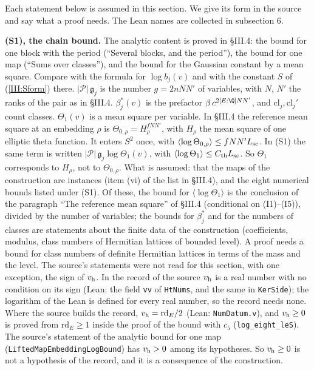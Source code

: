 \documentclass[11pt,letterpaper]{article}
\begin{document}
Each statement below is assumed in this section. We give its form in the source and say what a proof
needs. The Lean names are collected in subsection 6.

\textbf{(S1), the chain bound.} The analytic content is proved in \S III.4: the bound for one block with
the period (``Several blocks, and the period''), the bound for one map (``Sums over classes''), and the
bound for the Gaussian constant by a mean square. Compare with the formula for $\log b_j(v)$ and with the
constant $S$ of (\ref{III:Sform}) there. $|\mathcal P|\,\mathfrak g_j$ is the number $g=2nNN'$ of variables,
with $N$, $N'$ the ranks of the pair as in \S III.4. $\beta^{*}_j(v)$ is the prefactor
$\beta\,c^{2[E:\Q]NN'}$, and $\mathrm{cl}_j,\mathrm{cl}_j'$ count classes. $\Theta_1(v)$ is a mean square
per variable. In \S III.4 the reference mean square at an embedding $\rho$ is
$\Theta_{0,\rho}=H_\rho^{fNN'}$, with $H_\rho$ the mean square of one elliptic theta function. It enters
$S^2$ once, with $\langle\log\Theta_{0,\rho}\rangle\le fNN'L_{\rm sc}$. In (S1) the same term is written
$|\mathcal P|\,\mathfrak g_j\log\Theta_1(v)$, with $\langle\log\Theta_1\rangle\le C_{\rm th}L_{\rm sc}$. So
$\Theta_1$ corresponds to $H_\rho$, not to $\Theta_{0,\rho}$. What is assumed: that the maps of the construction are
instances (item (vi) of the list in \S III.4), and the eight numerical bounds listed under (S1). Of
these, the bound for $\langle\log\Theta_1\rangle$ is the conclusion of the paragraph ``The reference mean
square'' of \S III.4 (conditional on (I1)--(I5)), divided by the number of variables; the bounds for
$\beta^{*}_j$ and for the numbers of classes are statements about the finite data of the construction
(coefficients, modulus, class numbers of Hermitian lattices of bounded level). A proof needs a bound for
class numbers of definite Hermitian lattices in terms of the mass and the level. The source's statements
were not read for this section, with one exception, the sign of $v_{\rm h}$. In the record of the source
$v_{\rm h}$ is a real number with no condition on its sign (Lean: the field \texttt{vv} of
\texttt{HtNums}, and the same in \texttt{KerSide}); the logarithm of the Lean is defined for every real
number, so the record needs none. Where the source builds the record, $v_{\rm h}=\mathrm{rd}_E/2$ (Lean:
\texttt{NumDatum.v}), and $v_{\rm h}\ge0$ is proved from $\mathrm{rd}_E\ge1$ inside the proof of the bound
with $c_5$ (\texttt{log\_eight\_leS}). The source's statement of the analytic bound for one map
(\texttt{LiftedMapEmbeddingLogBound}) has $v_{\rm h}>0$ among its hypotheses. So $v_{\rm h}\ge0$ is not a
hypothesis of the record, and it is a consequence of the construction.
\end{document}
